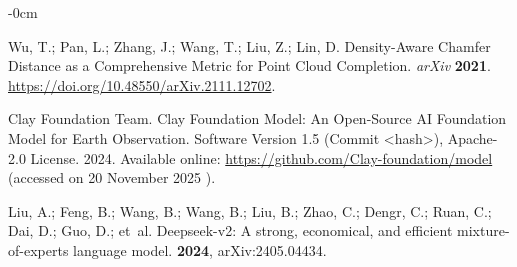 \documentclass[remotesensing,article,accept,pdftex,moreauthors]{Definitions/mdpi}
\renewcommand{\hl}[1]{#1}
\begin{document}
\begin{adjustwidth}{-\extralength}{0cm}
\begin{thebibliography}{999}
Wu, T.; Pan, L.; Zhang, J.; Wang, T.; Liu, Z.; Lin, D.
\newblock Density-Aware Chamfer Distance as a Comprehensive Metric for Point
  Cloud Completion. \emph{\hl{arXiv} %
}  \textbf{2021}.
  {\url{https://doi.org/10.48550/arXiv.2111.12702}}.

{Clay Foundation Team}.
\newblock Clay Foundation Model: An Open-Source AI Foundation Model for Earth
  Observation. Software Version 1.5 (Commit <hash>), Apache-2.0 License. 2024. Available online:
\newblock \url{https://github.com/Clay-foundation/model} (\hl{accessed on 20 November 2025}%
).

Liu, A.; Feng, B.; Wang, B.; Wang, B.; Liu, B.; Zhao, C.; Dengr, C.; Ruan, C.;
  Dai, D.; Guo, D.;  et~al.
\newblock Deepseek-v2: A strong, economical, and efficient mixture-of-experts
  language model.
 {\bf 2024}, arXiv:2405.04434.

\end{thebibliography}

  \PublishersNote{}
  \end{adjustwidth}

\end{document}

